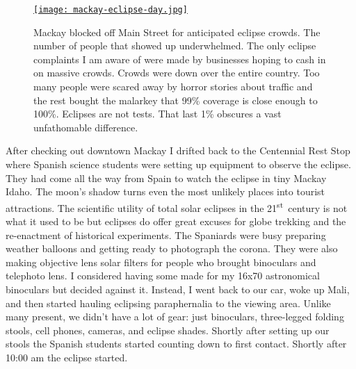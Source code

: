 \begin{figure}[htbp]
\centering
\href{https://conceptcontrol.smugmug.com/Places/USA-and-Canada/Idaho-Instants}{\texttt{[image: mackay-eclipse-day.jpg]}}
\caption[Mackay blocked off Main Street for anticipated eclipse crowds. The
number of people that showed up underwhelmed.]{Mackay blocked off Main Street for anticipated eclipse crowds. The
number of people that showed up underwhelmed. The only eclipse
complaints I am aware of were made by businesses hoping to cash in on
massive crowds. Crowds were down over the entire country. Too many
people were scared away by horror stories about traffic and the rest
bought the malarkey that 99\% coverage is close enough to 100\%.
Eclipses are not tests. That last 1\% obscures a vast unfathomable
difference.}
\label{fig:5430x3}
\end{figure}



After checking out downtown Mackay I drifted back to the Centennial Rest
Stop where Spanish science students were setting up equipment to observe
the eclipse. They had come all the way from Spain to watch the eclipse
in tiny Mackay Idaho. The moon's shadow turns even the most unlikely
places into tourist attractions. The scientific utility of total solar
eclipses in the 21\textsuperscript{st}~century is not what it used to be
but eclipses do offer great excuses for globe trekking and the
re-enactment of historical experiments. The Spaniards were busy
preparing weather balloons and getting ready to photograph the corona.
They were also making objective lens solar filters for people who
brought binoculars and telephoto lens. I considered having some made for
my 16x70 astronomical binoculars but decided against it. Instead, I went
back to our car, woke up Mali, and then started hauling eclipsing
paraphernalia to the viewing area. Unlike many present, we didn't have a
lot of gear: just binoculars, three-legged folding stools, cell phones,
cameras, and eclipse shades. Shortly after setting up our stools the
Spanish students started counting down to first contact. Shortly after
10:00 am the eclipse started.


